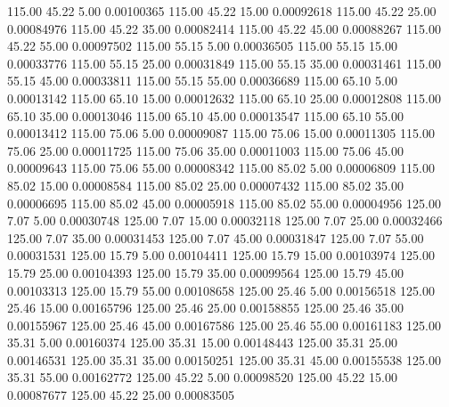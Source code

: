     115.00     45.22      5.00     0.00100365
    115.00     45.22     15.00     0.00092618
    115.00     45.22     25.00     0.00084976
    115.00     45.22     35.00     0.00082414
    115.00     45.22     45.00     0.00088267
    115.00     45.22     55.00     0.00097502
    115.00     55.15      5.00     0.00036505
    115.00     55.15     15.00     0.00033776
    115.00     55.15     25.00     0.00031849
    115.00     55.15     35.00     0.00031461
    115.00     55.15     45.00     0.00033811
    115.00     55.15     55.00     0.00036689
    115.00     65.10      5.00     0.00013142
    115.00     65.10     15.00     0.00012632
    115.00     65.10     25.00     0.00012808
    115.00     65.10     35.00     0.00013046
    115.00     65.10     45.00     0.00013547
    115.00     65.10     55.00     0.00013412
    115.00     75.06      5.00     0.00009087
    115.00     75.06     15.00     0.00011305
    115.00     75.06     25.00     0.00011725
    115.00     75.06     35.00     0.00011003
    115.00     75.06     45.00     0.00009643
    115.00     75.06     55.00     0.00008342
    115.00     85.02      5.00     0.00006809
    115.00     85.02     15.00     0.00008584
    115.00     85.02     25.00     0.00007432
    115.00     85.02     35.00     0.00006695
    115.00     85.02     45.00     0.00005918
    115.00     85.02     55.00     0.00004956
    125.00      7.07      5.00     0.00030748
    125.00      7.07     15.00     0.00032118
    125.00      7.07     25.00     0.00032466
    125.00      7.07     35.00     0.00031453
    125.00      7.07     45.00     0.00031847
    125.00      7.07     55.00     0.00031531
    125.00     15.79      5.00     0.00104411
    125.00     15.79     15.00     0.00103974
    125.00     15.79     25.00     0.00104393
    125.00     15.79     35.00     0.00099564
    125.00     15.79     45.00     0.00103313
    125.00     15.79     55.00     0.00108658
    125.00     25.46      5.00     0.00156518
    125.00     25.46     15.00     0.00165796
    125.00     25.46     25.00     0.00158855
    125.00     25.46     35.00     0.00155967
    125.00     25.46     45.00     0.00167586
    125.00     25.46     55.00     0.00161183
    125.00     35.31      5.00     0.00160374
    125.00     35.31     15.00     0.00148443
    125.00     35.31     25.00     0.00146531
    125.00     35.31     35.00     0.00150251
    125.00     35.31     45.00     0.00155538
    125.00     35.31     55.00     0.00162772
    125.00     45.22      5.00     0.00098520
    125.00     45.22     15.00     0.00087677
    125.00     45.22     25.00     0.00083505
